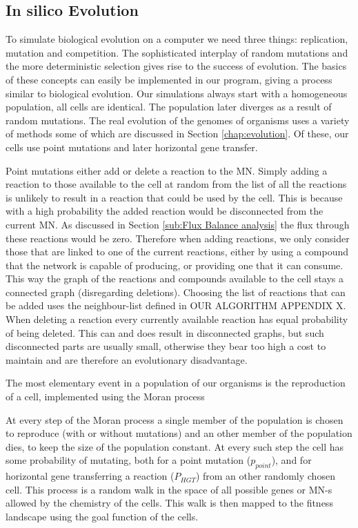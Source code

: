 \documentclass[a4paper,12pt]{article}
\begin{document}
\subsection{In silico Evolution}
\label{sub:implementing evolution}
To simulate biological evolution on a computer we need three things: replication, mutation and competition. The sophisticated interplay of random mutations and the more deterministic selection gives rise to the success of evolution. The basics of these concepts can easily be implemented in our program, giving a process similar to biological evolution. Our simulations always start with a homogeneous population, all cells are identical. The population later diverges as a result of random mutations. The real evolution of the genomes of organisms uses a variety of methods some of which are discussed in Section \ref{chap:evolution}. Of these, our cells use point mutations and later horizontal gene transfer.
	
	Point mutations either add or delete a reaction to the MN. Simply adding a reaction to those available to the cell at random from the list of all the reactions is unlikely to result in a reaction that could be used by the cell. This is because with a high probability the added reaction would be disconnected from the current MN. As discussed in Section \ref{sub:Flux Balance analysis} the flux through these reactions would be zero. Therefore when adding reactions, we only consider those that are linked  to one of the current reactions, either by using a compound that  the network is capable of producing, or providing one that it can consume. %
	This way the graph of the reactions and compounds available to the cell stays a connected graph (disregarding deletions). Choosing the list of reactions that can be added uses the neighbour-list defined in OUR ALGORITHM APPENDIX X. When deleting a reaction every currently available reaction has equal probability of being deleted. This can and does result in disconnected graphs, but such disconnected parts are usually small, otherwise they bear too high a cost to maintain and are therefore an evolutionary disadvantage.
	
The most elementary event in a population of our organisms is the reproduction of a cell, implemented using the Moran process \cite{moranprocess} 

At every step of the Moran process a single member of the population is chosen to reproduce (with or without mutations) and an other member of the population dies, to keep the size of the population constant. At every such step the cell has some probability of mutating, both for a point mutation ($p_{point}$), and for horizontal gene transferring a reaction ($P_{HGT}$) from an other randomly chosen cell.  This process is a random walk in the space of all possible genes or MN-s allowed by the chemistry of the cells.  This walk is then mapped to the fitness landscape using the goal function of the cells.
\end{document}
